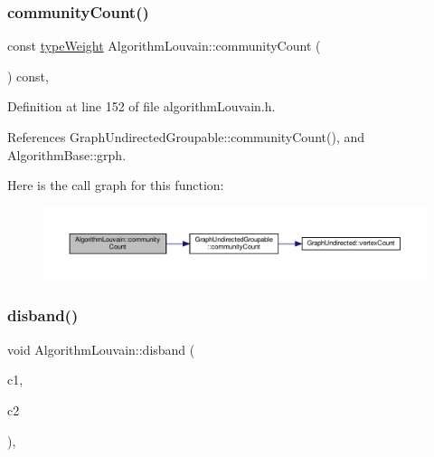 \subsubsection{\texorpdfstring{community\+Count()}{communityCount()}}
{\footnotesize\ttfamily const \hyperlink{edge_8h_a2e7ea3be891ac8b52f749ec73fee6dd2}{type\+Weight} Algorithm\+Louvain\+::community\+Count (\begin{DoxyParamCaption}{ }\end{DoxyParamCaption}) const\hspace{0.3cm}{\ttfamily [inline]}, {\ttfamily [private]}}



Definition at line 152 of file algorithm\+Louvain.\+h.



References Graph\+Undirected\+Groupable\+::community\+Count(), and Algorithm\+Base\+::grph.

Here is the call graph for this function\+:
\nopagebreak
\begin{figure}[H]
\begin{center}
\leavevmode
\includegraphics[width=350pt]{classAlgorithmLouvain_a8a8af8c837dd1a24a6be7904121edbbd_cgraph}
\end{center}
\end{figure}
\mbox{\label{classAlgorithmLouvain_a1e38f3c6a2df8b028328131b3dfceb94}} 
\subsubsection{\texorpdfstring{disband()}{disband()}}
{\footnotesize\ttfamily void Algorithm\+Louvain\+::disband (\begin{DoxyParamCaption}\item[{const \hyperlink{graphUndirectedGroupable_8h_a914da95c9ea7f14f4b7f875c36818556}{type\+Community}}]{c1,  }\item[{const \hyperlink{graphUndirectedGroupable_8h_a914da95c9ea7f14f4b7f875c36818556}{type\+Community}}]{c2 }\end{DoxyParamCaption})\hspace{0.3cm}{\ttfamily [inline]}, {\ttfamily [private]}}

